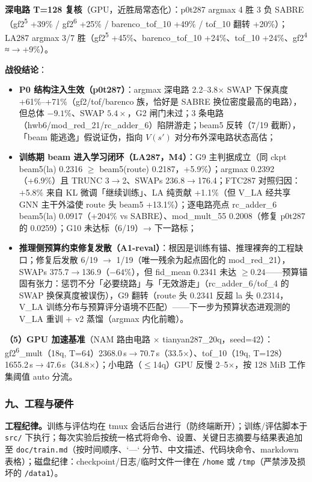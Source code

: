 \textbf{深电路 T=128 复核}（GPU，近胜局常态化）：p0t287 argmax 4 胜 3 负 SABRE（gf2\textsuperscript{5} +39\% / gf2\textsuperscript{6} +25\% / barenco\_tof\_10 +49\% / tof\_10 翻转 +20\%）；LA287 argmax 3/7 胜（gf2\textsuperscript{5} +45\%、barenco\_tof\_10 +24\%、tof\_10 +24\%、gf2\textsuperscript{4} ≈$\to$+9\%）。

\textbf{战役结论}：
\begin{itemize}
    \item \textbf{P0 结构注入生效（p0t287）}：argmax 深电路 2.2--3.8$\times$ SWAP 下保真度 +61\%--+71\%（gf2/tof/barenco 族，恰好是 SABRE 换位密度最高的电路），但总体 $-9.1\%$、SWAP $5.4\times$，G2 闸门未过；3 条电路（hwb6/mod\_red\_21/rc\_adder\_6）陷阱游走；beam5 反转（7/19 截断），「beam 能逃逸」假说证伪，指向 $V(s')$ 对分布外深电路状态高估；
    \item \textbf{训练期 beam 进入学习闭环（LA287，M4）}：G9 主判据成立（同 ckpt beam5(la) 0.2316 $\ge$ beam5(route) 0.2187，+5.9\%）；argmax 0.2392（+6.9\%）且 TRUNC 3$\to$2、SWAPs 236.8$\to$176.4；FTC287 对照归因：+5.8\% 来自 KL 微调「继续训练」、LA 纯贡献 +1.1\%（但 V\_LA 经共享 GNN 主干外溢使 route 头 beam5 +13.1\%）；逐电路亮点 rc\_adder\_6 beam5(la) 0.0917（+204\% vs SABRE）、mod\_mult\_55 0.2008（修复 p0t287 的 0.0259）；G10 未达标（6/19）→ 下一路标；
    \item \textbf{推理侧预算约束修复发散（A1-reval）}：根因是训练有锚、推理裸奔的工程缺口；修复后发散 6/19 $\to$ 1/19（唯一残余为起点固化的 mod\_red\_21），SWAPs 375.7$\to$136.9（$-64\%$），但 fid\_mean 0.2341 未达 $\ge0.24$——预算锚固有张力：惩罚不分「必要绕路」与「无效游走」（rc\_adder\_6/tof\_4 的 SWAP 换保真度被误伤），G9 翻转（route 头 0.2341 反超 la 头 0.2314，V\_LA 训练分布与预算评分语境不匹配）——下一步为预算状态进观测的 V\_LA 重训 + v2 蒸馏（argmax 内化前瞻）。
\end{itemize}

\textbf{（5）GPU 加速基准}（NAM 路由电路 $\times$ tianyan287\_20q，seed=42）：gf2\textsuperscript{6}\_mult（18q, T=64）2368.0\,s$\to$70.7\,s（33.5$\times$）、tof\_10（19q, T=128）1655.2\,s$\to$47.6\,s（34.8$\times$）；小电路（$\le$14q）GPU 反慢 2--5$\times$，按 128 MiB 工作集阈值 auto 分流。


\subsubsection{九、工程与硬件}

\textbf{工程纪律。}训练与评估均在 tmux 会话后台进行（防终端断开）；训练/评估脚本于 \texttt{src/} 下执行；每次实验后按统一格式将命令、设置、关键日志摘要与结果表追加至 \texttt{doc/train.md}（按时间顺序、`---` 分节、中文描述、代码块命令、markdown 表格）；磁盘纪律：checkpoint/日志/临时文件一律在 \texttt{/home} 或 \texttt{/tmp}（严禁涉及损坏的 \texttt{/data1}）。

